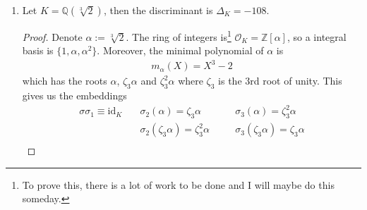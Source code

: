 \begin{example}
\begin{enumerate}
\begin{proof}
\begin{enumerate}
\begin{align*}
\begin{pmatrix}
                        \frac{1 + \sqrt{d}}{2} & \frac{1 - \sqrt{d}}{2}
                    \end{pmatrix}^2
                    = \left(\frac{1 - \sqrt{d}}{2} - \frac{1 + \sqrt{d}}{2}\right)^2
                    = \left(-\frac{2 \sqrt{d}}{2}\right)^2 = d \text{.}
                \end{align*}
                \item On the other hand, if \(\alpha = \sqrt{d}\), then a integral basis and its conjugate are
                \begin{align*}
                    \set{1, \sqrt{d}} \text{ and } \set{1, -\sqrt{d}}
                \end{align*}
                and hence we have
                \begin{align*}
                    \Delta_K = \begin{pmatrix}
                        1 & 1 \\
                        \sqrt{d} & -\sqrt{d}
                    \end{pmatrix}^2
                    = \left(-2\sqrt{d}\right)^2 = 4d \text{.}
                \end{align*}
            \end{enumerate}
            Conclude the stated result above.
        \end{proof}
    \item Let \(K = \mathbb{Q}(\sqrt[3]{2})\), then the discriminant is \(\Delta_K = -108\).
    \begin{proof}
        Denote \(\alpha := \sqrt[3]{2}\). The ring of integers is\footnote{To prove this, there is a lot of work to be done and I will maybe do this someday.} \(\mathcal{O}_K = \mathbb{Z}[\alpha]\), so a integral basis is \(\{1, \alpha, \alpha^2\}\). Moreover, the minimal polynomial of \(\alpha\) is
        \begin{align*}
            m_\alpha (X) = X^3 - 2
        \end{align*}
        which has the roots \(\alpha\), \(\zeta_3 \alpha\) and \(\zeta_3^2 \alpha\) where \(\zeta_3\) is the 3rd root of unity. This gives us the embeddings
        \begin{alignat*}
            \sigma \sigma_1 \equiv \mathrm{id}_K &\quad \sigma_2(\alpha) = \zeta_3 \alpha &&\quad \sigma_3(\alpha) = \zeta_3^2 \alpha \\
            &\quad \sigma_2(\zeta_3 \alpha) = \zeta_3^2 \alpha &&\quad \sigma_3(\zeta_3 \alpha) = \zeta_3 \alpha\\

\end{alignat*}
\end{proof}
\end{enumerate}
\end{example}
